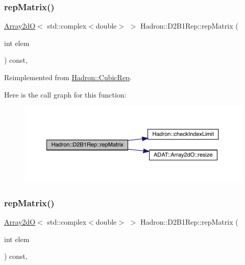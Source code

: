 \subsubsection{\texorpdfstring{repMatrix()}{repMatrix()}\hspace{0.1cm}{\footnotesize\ttfamily [1/2]}}
{\footnotesize\ttfamily \mbox{\hyperlink{classADAT_1_1Array2dO}{Array2dO}}$<$ std\+::complex$<$double$>$ $>$ Hadron\+::\+D2\+B1\+Rep\+::rep\+Matrix (\begin{DoxyParamCaption}\item[{int}]{elem }\end{DoxyParamCaption}) const\hspace{0.3cm}{\ttfamily [inline]}, {\ttfamily [virtual]}}



Reimplemented from \mbox{\hyperlink{structHadron_1_1CubicRep_ac5d7e9e6f4ab1158b5fce3e4ad9e8005}{Hadron\+::\+Cubic\+Rep}}.

Here is the call graph for this function\+:
\nopagebreak
\begin{figure}[H]
\begin{center}
\leavevmode
\includegraphics[width=350pt]{d1/d67/structHadron_1_1D2B1Rep_a3d7f68800d29238030406bf06553360f_cgraph}
\end{center}
\end{figure}
\mbox{\label{structHadron_1_1D2B1Rep_a3d7f68800d29238030406bf06553360f}} 
\subsubsection{\texorpdfstring{repMatrix()}{repMatrix()}\hspace{0.1cm}{\footnotesize\ttfamily [2/2]}}
{\footnotesize\ttfamily \mbox{\hyperlink{classADAT_1_1Array2dO}{Array2dO}}$<$ std\+::complex$<$double$>$ $>$ Hadron\+::\+D2\+B1\+Rep\+::rep\+Matrix (\begin{DoxyParamCaption}\item[{int}]{elem }\end{DoxyParamCaption}) const\hspace{0.3cm}{\ttfamily [inline]}, {\ttfamily [virtual]}}



